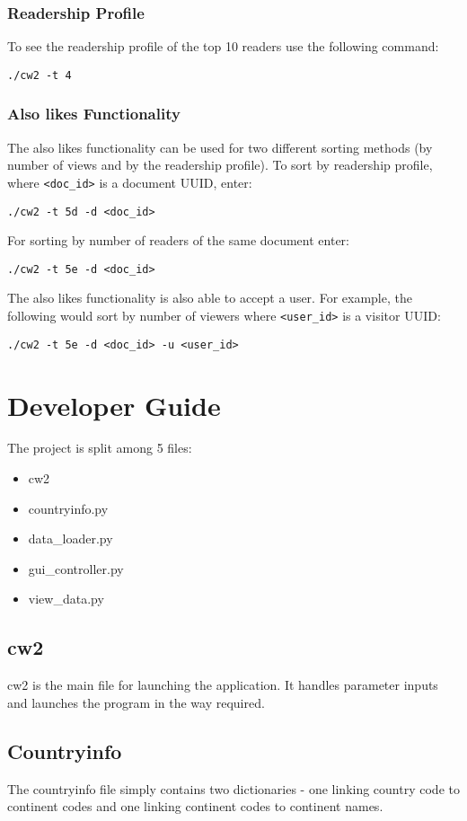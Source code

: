 \documentclass[11pt]{report}
\begin{document}
\subsection{Readership Profile}
To see the readership profile of the top 10 readers use the following command:
\begin{lstlisting}
./cw2 -t 4
\end{lstlisting}
\subsection{Also likes Functionality}
The also likes functionality can be used for two different sorting methods (by number of views and by the readership profile). To sort by readership profile, where \lstinline{<doc_id>} is a document UUID, enter:
\begin{lstlisting}
./cw2 -t 5d -d <doc_id>
\end{lstlisting}
For sorting by number of readers of the same document enter:
\begin{lstlisting}
./cw2 -t 5e -d <doc_id>
\end{lstlisting}
The also likes functionality is also able to accept a user.  For example, the following would sort by number of viewers where \lstinline{<user_id>} is a visitor UUID:
\begin{lstlisting}
./cw2 -t 5e -d <doc_id> -u <user_id>
\end{lstlisting}

\chapter{Developer Guide}

The project is split among 5 files:
\begin{itemize}
\item{cw2}
\item{countryinfo.py}
\item{data\_loader.py}
\item{gui\_controller.py}
\item{view\_data.py}
\end{itemize}

\section{cw2}
cw2 is the main file for launching the application.  It handles parameter inputs and launches the program in the way required.
\section{Countryinfo}
The countryinfo file simply contains two dictionaries - one linking country code to continent codes and one linking continent codes to continent names.
\end{document}
